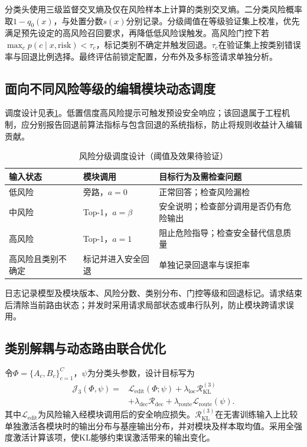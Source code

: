分类头使用三级监督交叉熵及仅在风险样本上计算的类别交叉熵。二分类风险概率取$1-q_0(x)$，与处置分数$s(x)$分别记录。分级阈值在等级验证集上校准，优先满足预先设定的高风险召回要求，再降低低风险误触发。高风险门控下若$\max_c p(c\mid x,\mathrm{risk})<\tau_c$，标记类别不确定并触发回退。$\tau_c$在验证集上按类别错误率与回退比例选择。最终评估前锁定配置，分布外及多标签请求单独分析。

\subsection{面向不同风险等级的编辑模块动态调度}

调度设计见表\ref{tab:ch3-dispatch}。低置信度高风险提示可触发预设安全响应；该回退属于工程机制，应分别报告回退前算法指标与包含回退的系统指标，防止将规则收益计入编辑贡献。

\begin{table}[htbp]
 \centering
 \caption{风险分级调度设计（阈值及效果待验证）}
 \label{tab:ch3-dispatch}
 \begin{tabular}{>{\raggedright\arraybackslash}p{}>{\raggedright\arraybackslash}p{}>{\raggedright\arraybackslash}p{}}
 \toprule
 输入状态 & 模块调用 & 目标行为及需检查问题\\ \midrule
 低风险 & 旁路，$a=0$ & 正常回答；检查风险漏检\\
 中风险 & Top-1，$a=\beta$ & 安全说明；检查部分调用是否仍有危险输出\\
 高风险 & Top-1，$a=1$ & 阻止危险指导；检查安全替代信息质量\\
 高风险且类别不确定 & 标记并进入安全回退 & 单独记录回退率与误拒率\\
 \bottomrule
 \end{tabular}
\end{table}

日志记录模型及模块版本、风险分数、类别分布、门控等级和回退标记。请求结束后清除当前路由状态；并发时采用请求局部状态或串行队列，防止模块跨请求误用。

\subsection{类别解耦与动态路由联合优化}

令$\Phi=\{A_c,B_c\}_{c=1}^{C}$，$\psi$为分类头参数，设计目标写为
\begin{equation}
 \begin{aligned}
 \mathcal J_3(\Phi,\psi)={}&\mathcal L_{\mathrm{edit}}(\Phi;\psi)
 +\lambda_{\mathrm{loc}}\mathcal R_{\mathrm{KL}}^{(3)}\\
 &+\lambda_{\mathrm{dec}}\mathcal R_{\mathrm{dec}}
 +\lambda_{\mathrm{route}}\mathcal L_{\mathrm{route}}(\psi).
 \end{aligned}
 \label{eq:ch3-joint}
\end{equation}
其中$\mathcal L_{\mathrm{edit}}$为风险输入经模块调用后的安全响应损失。$\mathcal R_{\mathrm{KL}}^{(3)}$在无害训练输入上比较单独激活各模块时的输出分布与基座输出分布，并对模块及样本取均值。采用全强度激活计算该项，使KL能够约束误激活带来的输出变化。

